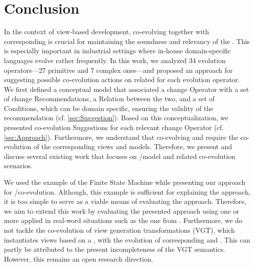 \section{Conclusion} \label{sec:Conclusion}

In the context of view-based development, co-evolving \viewtypes together with corresponding \metamodels is crucial for maintaining the soundness and relevancy of the \viewtypes. This is especially important in industrial settings where in-house domain-specific languages evolve rather frequently. In this work, we 
analyzed 34 \metamodel evolution operators---27 primitive and 7 complex ones---and proposed an approach for suggesting possible co-evolution actions on related \viewtypes for each \metamodel evolution operator. We first defined a conceptual model that associated a \metamodel change \textsf{Operator} with a set of \viewtype change \textsf{Recommendation}s, a \textsf{Relation} between the two, and a set of \textsf{Conditions}, which can be domain specific, ensuring the validity of the recommendation (cf. \cref{sec:Suggestion}). Based on this conceptualization, we presented \viewtype co-evolution \textsf{Suggestion}s for each relevant \metamodel change \textsf{Operator} (cf. \cref{sec:Approach}). Furthermore, we understand that co-evolving \viewtypes and \metamodels require the co-evolution of the corresponding views and models. Therefore, we present and discuss several existing work that focuses on \metamodel/model and related co-evolution scenarios. 

We used the example of the Finite State Machine while presenting our approach for \viewtype/\metamodel co-evolution. Although, this example is sufficient for explaining the approach, it is too simple to serve as a viable means of evaluating the approach. Therefore, we aim to extend this work by evaluating the presented approach using one or more \metamodels applied in real-word situations such as the one from \textcite{braun_classification_2014}. Furthermore, we do not tackle the co-evolution of view generation transformations (VGT), which instantiates views based on a \viewtype, with the evolution of corresponding \viewtypes and \metamodels. This can partly be attributed to the present incompleteness of the VGT semantics. However, this remains an open research direction. 


